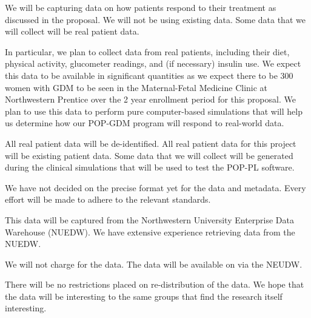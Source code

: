 \documentclass[11pt]{article}
\begin{document}
\newpage

\setcounter{page}{1}
\pagestyle{empty}



We will be capturing data on how patients respond to their treatment
as discussed in the proposal. We will not be using existing data.
Some data that we will collect will be real patient data. 

In particular, we plan to collect data from real patients, including
their diet, physical activity, glucometer readings, and (if necessary)
insulin use. We expect this data to be available in significant
quantities as we expect there to be 300 women with GDM to be seen in
the Maternal-Fetal Medicine Clinic at Northwestern Prentice over the 2
year enrollment period for this proposal. We plan to use this data to
perform pure computer-based simulations that will help us determine
how our POP-GDM program will respond to real-world data.

All real patient data will be de-identified. All real patient data for
this project will be existing patient data.  Some data that we will
collect will be generated during the clinical simulations that will be
used to test the POP-PL software.

We have not decided on the precise format yet for the data and
metadata. Every effort will be made to adhere to the relevant
standards.

This data will be captured from the Northwestern University Enterprise
Data Warehouse (NUEDW). We have extensive experience retrieving data
from the NUEDW.

We will not charge for the data. The data will be available on via the
NEUDW.

There will be no restrictions placed on re-distribution of the data.
We hope that the data will be interesting to the same groups that find
the research itself interesting.

\newpage
\setcounter{page}{1}
\pagestyle{plain}


\end{document}
